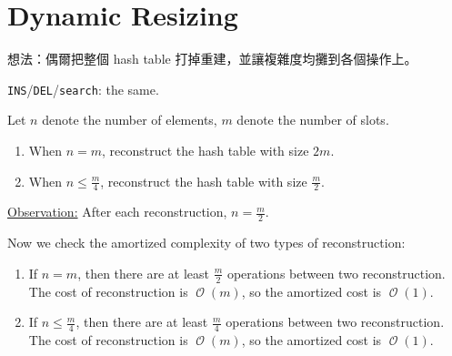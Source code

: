 \documentclass[a4paper]{article}
\DeclareMathOperator{\Ord}{\mathcal{O}}
\theoremstyle{mystyle}
\begin{document}
\section{Dynamic Resizing}
想法：偶爾把整個 hash table 打掉重建，並讓複雜度均攤到各個操作上。

{\tt INS}/{\tt DEL}/{\tt search}: the same.

Let $n$ denote the number of elements, $m$ denote the number of slots.

\begin{enumerate}
  \item When $n = m$, reconstruct the hash table with size $2m$.
  \item When $n \le \frac{m}{4}$, reconstruct the hash table with size $\frac{m}{2}$.
\end{enumerate}

\underline{Observation:} After each reconstruction, $n = \frac{m}{2}$.

Now we check the amortized complexity of two types of reconstruction:
\begin{enumerate}
  \item If $n = m$, then there are at least $\frac{m}{2}$ operations between two
    reconstruction. The cost of reconstruction is $\Ord(m)$, so the amortized
    cost is $\Ord(1)$.
  \item If $n \le \frac{m}{4}$, then there are at least $\frac{m}{4}$ operations
    between two reconstruction. The cost of reconstruction is $\Ord(m)$, so the
    amortized cost is $\Ord(1)$.
\end{enumerate}
\end{document}
